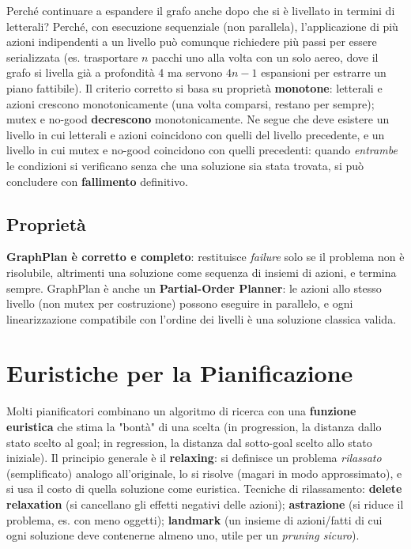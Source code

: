 \documentclass[a4paper,11pt]{article}
\begin{document}
Perché continuare a espandere il grafo anche dopo che si è livellato in termini di letterali? Perché, con esecuzione sequenziale (non parallela), l'applicazione di più azioni indipendenti a un livello può comunque richiedere più passi per essere serializzata (es. trasportare $n$ pacchi uno alla volta con un solo aereo, dove il grafo si livella già a profondità 4 ma servono $4n{-}1$ espansioni per estrarre un piano fattibile). Il criterio corretto si basa su proprietà \textbf{monotone}: letterali e azioni crescono monotonicamente (una volta comparsi, restano per sempre); mutex e no-good \textbf{decrescono} monotonicamente. Ne segue che deve esistere un livello in cui letterali e azioni coincidono con quelli del livello precedente, e un livello in cui mutex e no-good coincidono con quelli precedenti: quando \emph{entrambe} le condizioni si verificano senza che una soluzione sia stata trovata, si può concludere con \textbf{fallimento} definitivo.

\subsection{Proprietà}

\textbf{GraphPlan è corretto e completo}: restituisce \emph{failure} solo se il problema non è risolubile, altrimenti una soluzione come sequenza di insiemi di azioni, e termina sempre. GraphPlan è anche un \textbf{Partial-Order Planner}: le azioni allo stesso livello (non mutex per costruzione) possono eseguire in parallelo, e ogni linearizzazione compatibile con l'ordine dei livelli è una soluzione classica valida.

\newpage
\section{Euristiche per la Pianificazione}

Molti pianificatori combinano un algoritmo di ricerca con una \textbf{funzione euristica} che stima la "bontà" di una scelta (in progression, la distanza dallo stato scelto al goal; in regression, la distanza dal sotto-goal scelto allo stato iniziale). Il principio generale è il \textbf{relaxing}: si definisce un problema \emph{rilassato} (semplificato) analogo all'originale, lo si risolve (magari in modo approssimato), e si usa il costo di quella soluzione come euristica. Tecniche di rilassamento: \textbf{delete relaxation} (si cancellano gli effetti negativi delle azioni); \textbf{astrazione} (si riduce il problema, es. con meno oggetti); \textbf{landmark} (un insieme di azioni/fatti di cui ogni soluzione deve contenerne almeno uno, utile per un \emph{pruning sicuro}).
\end{document}
